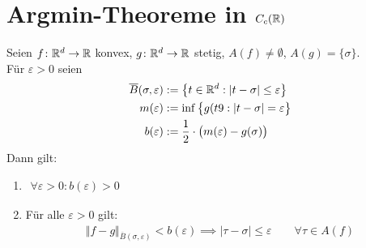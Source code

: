 
\section{Argmin-Theoreme in \texorpdfstring{$C_c(\mathbb{R})$}{C\_c(R)}} %

\begin{lemma}\label{lemma10.1}
	Seien $f\colon\mathbb{R}^d\to\mathbb{R}$ konvex, $g\colon\mathbb{R}^d\to\mathbb{R}$ stetig, $A(f)\neq\emptyset$, $A(g)=\lbrace\sigma\rbrace$.\\
	Für $\varepsilon>0$ seien
	\begin{align*}
		\overline{B}(\sigma,\varepsilon)&:=\big\lbrace t\in\mathbb{R}^d:|t-\sigma|\leq\varepsilon\big\rbrace\\
		m(\varepsilon)&:=\inf\limits\big\lbrace g(t9:|t-\sigma|=\varepsilon\big\rbrace\\
		b(\varepsilon)&:=\frac{1}{2}\cdot\big(m(\varepsilon)-g(\sigma)\big)
	\end{align*}
	Dann gilt:
	\begin{enumerate}[label=(\arabic*)]
		\item $\begin{aligned}
			\forall\varepsilon>0:b(\varepsilon)>0
		\end{aligned}$
		\item Für alle $\varepsilon>0$ gilt:
		\begin{align*}
			\Vert f-g\Vert_{\overline{B}(\sigma,\varepsilon)}<b(\varepsilon)
			\implies|\tau-\sigma|\leq\varepsilon\qquad\forall\tau\in A(f)
		\end{align*}
	\end{enumerate}
\end{lemma}

